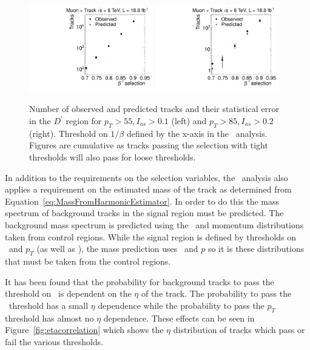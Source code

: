 \begin{figure}
\begin{center}
\includegraphics[clip=false, trim=0.0cm 0cm 0.0cm 0cm, width=0.48\textwidth]{figures/tkmu/Pred_Flip_I010_Pt55_Data8TeV}
\includegraphics[clip=false, trim=0.0cm 0cm 0.0cm 0cm, width=0.48\textwidth]{figures/tkmu/Pred_Flip_I020_Pt85_Data8TeV}
\caption[Number of observed and predicted tracks in the \invbeta\ $<$ 1 region in the \tktof\ analysis.]
{Number of observed and predicted tracks and their statistical error in the $D^\prime$ region for $p_T>55, I_{as}>0.1$ (left)
and $p_T>85, I_{as}>0.2$ (right). Threshold on $1/\beta$ defined by the x-axis
in the \tktof\ analysis. Figures are cumulative as tracks passing the selection with tight thresholds will also pass for loose thresholds.}
\label{fig:PredFlipTkTOF}
\end{center}
\end{figure}

In addition to the requirements on the selection variables, the \tktof\ analysis also applies a requirement on the estimated mass of the track as determined from 
Equation~\ref{eq:MassFromHarmonicEstimator}. In order to do this the mass spectrum of background tracks in the signal region must be predicted.
The background mass spectrum is predicted using the \dedx\ and momentum distributions taken from control regions. While the signal region is defined by thresholds on \ias\ and
$p_T$ (as well as \invbeta), the mass prediction uses \ih\ and $p$ so it is these distributions that must be taken from the control regions. 

It has been found that the probability for background tracks to pass the threshold on \ias\ is dependent on the $\eta$ of the track.
The probability to pass the \invbeta\ threshold has a small $\eta$
dependence while the probability to pass the $p_T$ threshold has almost no $\eta$ dependence. These effects can be seen in Figure~\ref{fig:etacorrelation} which shows the $\eta$
distribution of tracks which
pass or fail the various thresholds. 

